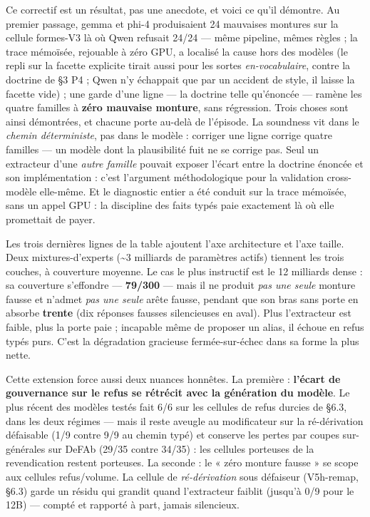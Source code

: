 \documentclass[11pt]{article}
\begin{document}
Ce correctif est un résultat, pas une anecdote, et voici ce qu'il démontre. Au premier passage, gemma et phi-4 produisaient 24 mauvaises montures sur la cellule formes-V3 là où Qwen refusait 24/24 — même pipeline, mêmes règles ; la trace mémoïsée, rejouable à zéro GPU, a localisé la cause hors des modèles (le repli sur la facette explicite tirait aussi pour les sortes \emph{en-vocabulaire}, contre la doctrine de §3 P4 ; Qwen n'y échappait que par un accident de style, il laisse la facette vide) ; une garde d'une ligne — la doctrine telle qu'énoncée — ramène les quatre familles à \textbf{zéro mauvaise monture}, sans régression. Trois choses sont ainsi démontrées, et chacune porte au-delà de l'épisode. La soundness vit dans le \emph{chemin déterministe}, pas dans le modèle : corriger une ligne corrige quatre familles — un modèle dont la plausibilité fuit ne se corrige pas. Seul un extracteur d'une \emph{autre famille} pouvait exposer l'écart entre la doctrine énoncée et son implémentation : c'est l'argument méthodologique pour la validation cross-modèle elle-même. Et le diagnostic entier a été conduit sur la trace mémoïsée, sans un appel GPU : la discipline des faits typés paie exactement là où elle promettait de payer.

Les trois dernières lignes de la table ajoutent l'axe architecture et l'axe taille. Deux mixtures-d'experts (\textasciitilde{}3 milliards de paramètres actifs) tiennent les trois couches, à couverture moyenne. Le cas le plus instructif est le 12 milliards dense : sa couverture s'effondre — \textbf{79/300} — mais il ne produit \emph{pas une seule} monture fausse et n'admet \emph{pas une seule} arête fausse, pendant que son bras sans porte en absorbe \textbf{trente} (dix réponses fausses silencieuses en aval). Plus l'extracteur est faible, plus la porte paie ; incapable même de proposer un alias, il échoue en refus typés purs. C'est la dégradation gracieuse fermée-sur-échec dans sa forme la plus nette.

Cette extension force aussi deux nuances honnêtes. La première : \textbf{l'écart de gouvernance sur le refus se rétrécit avec la génération du modèle}. Le plus récent des modèles testés fait 6/6 sur les cellules de refus durcies de §6.3, dans les deux régimes — mais il reste aveugle au modificateur sur la ré-dérivation défaisable (1/9 contre 9/9 au chemin typé) et conserve les pertes par coupes sur-générales sur DeFAb (29/35 contre 34/35) : les cellules porteuses de la revendication restent porteuses. La seconde : le « zéro monture fausse » se scope aux cellules refus/volume. La cellule de \emph{ré-dérivation} sous défaiseur (V5h-remap, §6.3) garde un résidu qui grandit quand l'extracteur faiblit (jusqu'à 0/9 pour le 12B) — compté et rapporté à part, jamais silencieux.
\end{document}
